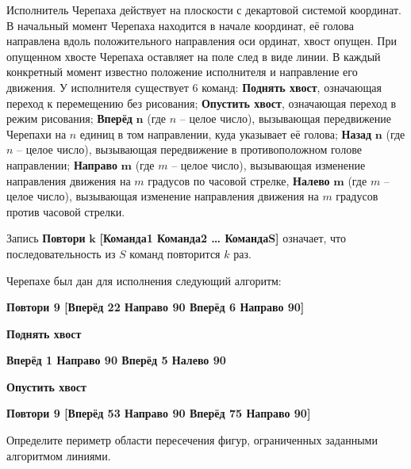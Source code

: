 \documentclass[14pt,a4paper]{article}
\begin{document}
Исполнитель Черепаха действует на плоскости с декартовой системой
координат. В начальный момент Черепаха находится в начале координат,
её голова направлена вдоль положительного направления оси ординат,
хвост опущен. При опущенном хвосте Черепаха оставляет на поле след в
виде линии. В каждый конкретный момент известно положение исполнителя
и направление его движения. У исполнителя существует 6 команд:
\textbf{Поднять хвост}, означающая переход к перемещению без
рисования; \textbf{Опустить хвост}, означающая переход в режим
рисования; \textbf{Вперёд} $\bm{n}$ (где $n$ – целое число),
вызывающая передвижение Черепахи на $n$ единиц в том направлении,
куда указывает её голова; \textbf{Назад} $\bm{n}$ (где $n$ – целое
число), вызывающая передвижение в противоположном голове направлении;
\textbf{Направо} $\bm{m}$ (где $m$ – целое число), вызывающая
изменение направления движения на $m$ градусов по часовой стрелке,
\textbf{Налево} $\bm{m}$ (где $m$ – целое число), вызывающая
изменение направления движения на $m$ градусов против часовой стрелки.

Запись \textbf{Повтори} $\bm{k}$ \textbf{[Команда1 Команда2 …
КомандаS]} означает, что последовательность из $S$ команд повторится
$k$ раз.

Черепахе был дан для исполнения следующий алгоритм:

\textbf{Повтори 9 [Вперёд 22 Направо 90 Вперёд 6 Направо 90]}

\textbf{Поднять хвост}

\textbf{Вперёд 1 Направо 90 Вперёд 5 Налево 90}

\textbf{Опустить хвост}

\textbf{Повтори 9 [Вперёд 53 Направо 90 Вперёд 75 Направо 90]}

Определите периметр области пересечения фигур, ограниченных заданными
алгоритмом линиями.
\end{document}
